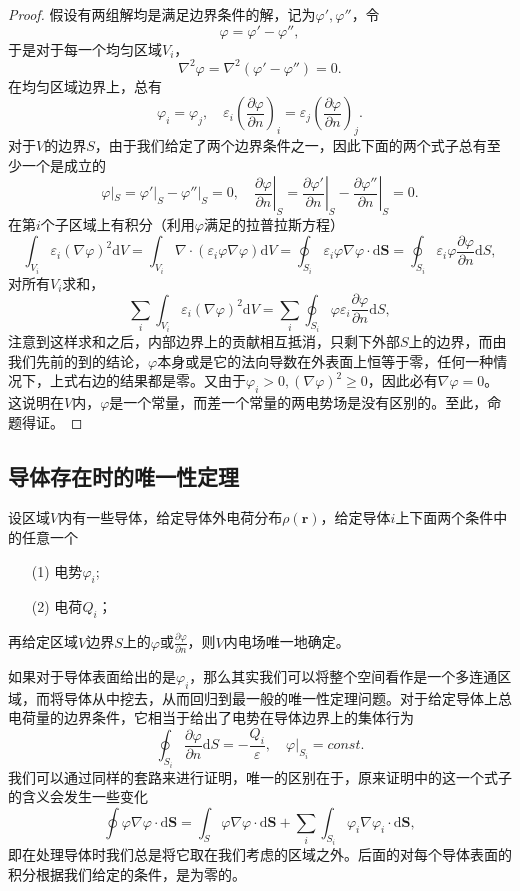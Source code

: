 \documentclass[UTF8]{ctexbook}
\renewcommand{\d}{\mathrm{d}}
\renewcommand{\b}{\boldsymbol}
\newtheorem{proof}{证明}
\numberwithin{equation}{chapter}
\begin{document}
	\begin{proof}
		假设有两组解均是满足边界条件的解，记为$\varphi',\varphi''$，令
		\[\varphi=\varphi'-\varphi'',\]
		于是对于每一个均匀区域$V_i$，
		\[\nabla^2\varphi=\nabla^2(\varphi'-\varphi'')=0.\]
		在均匀区域边界上，总有
		\[\varphi_i=\varphi_j,\quad \varepsilon_i\left(\frac{\partial \varphi}{\partial n}\right)_i=\varepsilon_j\left(\frac{\partial \varphi}{\partial n}\right)_j.\]
		对于$V$的边界$S$，由于我们给定了两个边界条件之一，因此下面的两个式子总有至少一个是成立的
		\[\varphi|_S=\varphi'|_S-\varphi''|_S=0,\quad \left.\frac{\partial \varphi}{\partial n}\right|_S=\left.\frac{\partial \varphi'}{\partial n}\right|_S-\left.\frac{\partial \varphi''}{\partial n}\right|_S=0.\]
		在第$i$个子区域上有积分（利用$\varphi$满足的拉普拉斯方程）
		\[\int_{V_i}\varepsilon_i(\nabla \varphi)^2\d V=\int_{V_i}\nabla\cdot(\varepsilon_i\varphi\nabla\varphi)\d V=\oint_{S_i}\varepsilon_i \varphi\nabla\varphi\cdot\d \b{S}=\oint_{S_i}\varepsilon_i\varphi\frac{\partial \varphi}{\partial n}\d S,\]
		对所有$V_i$求和，
		\[\sum_i \int_{V_i}\varepsilon_i(\nabla \varphi)^2\d V=\sum_{i}\oint_{S_i}\varphi\varepsilon_i\frac{\partial \varphi}{\partial n}\d S,\]
		注意到这样求和之后，内部边界上的贡献相互抵消，只剩下外部$S$上的边界，而由我们先前的到的结论，$\varphi$本身或是它的法向导数在外表面上恒等于零，任何一种情况下，上式右边的结果都是零。又由于$\varphi_i >0,(\nabla \varphi)^2 \geq 0$，因此必有$\nabla \varphi=0$。这说明在$V$内，$\varphi$是一个常量，而差一个常量的两电势场是没有区别的。至此，命题得证。
		
		
	\end{proof}
	
	\subsection{导体存在时的唯一性定理}
	设区域$V$内有一些导体，给定导体外电荷分布$\rho(\b{r})$，给定导体$i$上下面两个条件中的任意一个
	\begin{itemize}
		\item[(1)]电势$\varphi_i$;
		\item[(2)]电荷$Q_i$；
	\end{itemize}
	再给定区域$V$边界$S$上的$\varphi$或$\frac{\partial \varphi}{\partial n}$，则$V$内电场唯一地确定。
	
	如果对于导体表面给出的是$\varphi_i$，那么其实我们可以将整个空间看作是一个多连通区域，而将导体从中挖去，从而回归到最一般的唯一性定理问题。对于给定导体上总电荷量的边界条件，它相当于给出了电势在导体边界上的集体行为
	\[\oint_{S_i}\frac{\partial \varphi}{\partial n}\d S=-\frac{Q_i}{\varepsilon},\quad \varphi|_{S_i}=const.\]
	我们可以通过同样的套路来进行证明，唯一的区别在于，原来证明中的这一个式子的含义会发生一些变化
	\[\oint\varphi\nabla\varphi\cdot\d\b{S}=\int_{S}\varphi\nabla\varphi\cdot\d\b{S}+\sum_i\int_{S_i}\varphi_i\nabla\varphi_i\cdot\d\b{S},\]
	即在处理导体时我们总是将它取在我们考虑的区域之外。后面的对每个导体表面的积分根据我们给定的条件，是为零的。
	
\end{document}
